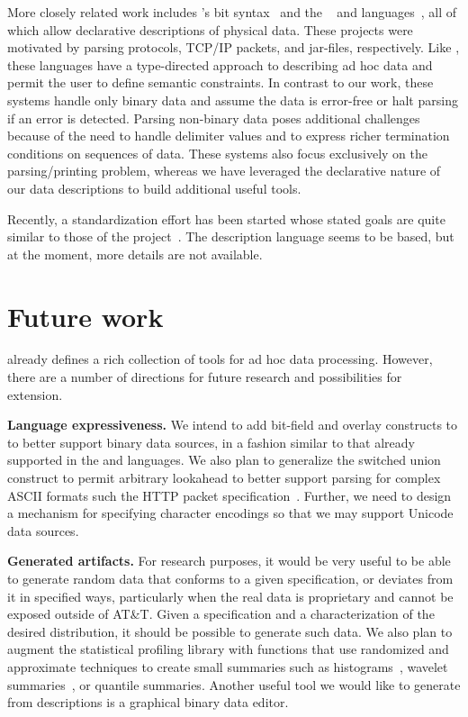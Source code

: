 \documentclass{sig-alternate}
\begin{document}
More closely related work includes \erlang{}'s bit syntax~\cite{erlang} and
the \packettypes{}~\cite{sigcomm00} and
\datascript{} languages~\cite{gpce02}, 
all of which allow declarative descriptions of physical data.  These projects were motivated by parsing protocols,
\textsc{TCP/IP} packets, and \java{} jar-files, respectively.  Like
\pads{}, these languages have a type-directed approach to
describing ad hoc data and permit the user to define semantic constraints.
In contrast to our
work, these systems handle only binary data and assume the data is
error-free or halt parsing if an error is detected. 
Parsing non-binary data poses additional challenges because of the need
to handle delimiter values and to express richer termination conditions
on sequences of data. These systems also
focus exclusively on the parsing/printing problem, whereas we have 
leveraged the declarative nature of
our data descriptions to build additional useful tools.


Recently, a standardization effort has been started whose stated goals are quite similar to those of the \pads{} project~\cite{dfdl}. The description
language seems to be \xml{} based, but at the moment, more details are 
not available.

\section{Future work}
\pads{} already defines a rich collection of tools for ad hoc data processing.
However, there are a number of directions for future research and possibilities for extension. 

\textbf{Language expressiveness.}  
We intend to add bit-field 
and overlay constructs to \pads{} to better support binary data sources,
in a fashion similar to that already supported in the \datascript{} and \packettypes{} languages.
We also plan to generalize the switched union construct to permit arbitrary lookahead to better support
parsing for complex ASCII formats such the HTTP packet specification~\cite{http}.  Further, we need to design a mechanism
for specifying character encodings so that we may support 
Unicode~\cite{unicode} data sources.

\textbf{Generated artifacts.} 
For research purposes, it would be very useful to be able to generate random data that conforms to a given specification, or 
deviates from it in specified ways, particularly when the real data is proprietary and cannot be exposed outside of AT\&T. 
Given a \pads{} specification and a characterization of the desired distribution, it should be possible to generate such data.  We also plan to augment the statistical profiling library with
functions that use randomized and approximate techniques to create
small summaries such as histograms~\cite{histograms,histograms-wavelets}, wavelet summaries~\cite{histograms-wavelets},
or quantile summaries\cite{quantiles}.
Another useful tool we 
would like to generate from \pads{} descriptions is a graphical binary data editor. 
\end{document}
